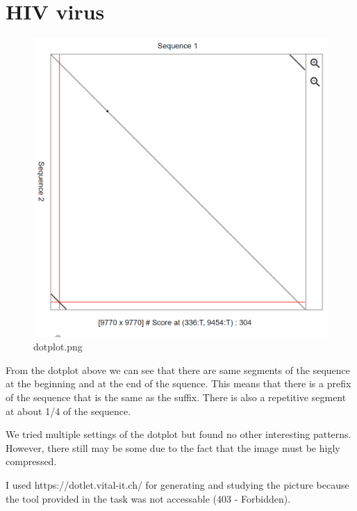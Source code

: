 \documentclass[11pt]{article}
\makeatletter
\def\maxwidth{\ifdim\Gin@nat@width>\linewidth\linewidth
    \else\Gin@nat@width\fi}
\let\Oldincludegraphics\includegraphics
\renewcommand{\includegraphics}[1]{\Oldincludegraphics[width=.8\maxwidth]{#1}}
\makeatother
\begin{document}
    \section{HIV virus}\label{hiv-virus}

    \begin{figure}
\centering
\includegraphics{dotplot.png}
\caption{dotplot.png}
\end{figure}

    From the dotplot above we can see that there are same segments of the
sequence at the beginning and at the end of the squence. This means that
there is a prefix of the sequence that is the same as the suffix. There
is also a repetitive segment at about 1/4 of the sequence.

We tried multiple settings of the dotplot but found no other interesting
patterns. However, there still may be some due to the fact that the
image must be higly compressed.

I used https://dotlet.vital-it.ch/ for generating and studying the
picture because the tool provided in the task was not accessable (403 -
Forbidden).


    
    
    
    
\end{document}
